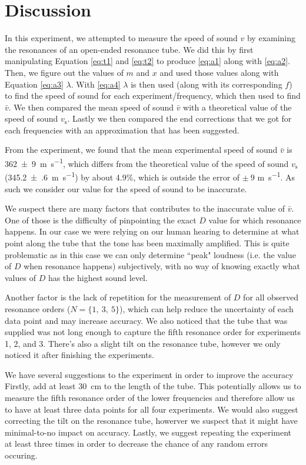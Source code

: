 \documentclass[letter]{article}
\numberwithin{equation}{section}
\numberwithin{figure}{section}
\numberwithin{table}{section}
\begin{document}
\section{Discussion}
In this experiment, we attempted to measure the speed of sound \(v\) by examining the resonances of an open-ended resonance tube. We did this by first manipulating Equation \ref{eq:t1} and \ref{eq:t2} to produce \eqref{eq:a1} along with \eqref{eq:a2}. Then, we figure out the values of \(m\) and \(x\) and used those values along with Equation \ref{eq:a3} \(\lambda\). With \eqref{eq:a4} \(\lambda\) is then used (along with its corresponding \(f\)) to find the speed of sound for each experiment/frequency, which then used to find \(\bar{v}\). We then compared the mean speed of sound \(\bar{v}\) with a theoretical value of the speed of sound \(v_\mathrm{s}\). Lastly we then compared the end corrections that we got for each frequencies with an approximation that has been suggested.

From the experiment, we found that the mean experimental speed of sound \(\bar{v}\) is \SI{362(9)}{\metre\per\second}, which differs from the theoretical value of the speed of sound \(v_{\mathrm{s}}\) (\SI{345.2(6)}{\metre\per\second}) by about 4.9\%, which is outside the error of \(\pm\ 9\) \si{\metre\per\second}. As such we consider our value for the speed of sound to be inaccurate.

We suspect there are many factors that contributes to the inaccurate value of \(\bar{v}\). One of those is the difficulty of pinpointing the exact \(D\) value for which resonance happens. In our case we were relying on our human hearing to determine at what point along the tube that the tone has been maximally amplified. This is quite problematic as in this case we can only determine ``peak" loudness (i.e. the value of \(D\) when resonance happens) subjectively, with no way of knowing exactly what values of \(D\) has the highest sound level.

Another factor is the lack of repetition for the measurement of \(D\) for all observed resonance orders (\(N = \{1, \ 3, \ 5\}\)), which can help reduce the uncertainty of each data point and may increase accuracy. We also noticed that the tube that was supplied was not long enough to capture the fifth resonance order for experiments 1, 2, and 3. There's also a slight tilt on the resonance tube, however we only noticed it after finishing the experiments.

We have several suggestions to the experiment in order to improve the accuracy Firstly, add at least \SI{30}{\cm} to the length of the tube. This potentially allows us to measure the fifth resonance order of the lower frequencies and therefore allow us to have at least three data points for all four experiments. We would also suggest correcting the tilt on the resonance tube, howerver we suspect that it might have minimal-to-no impact on accuracy. Lastly, we suggest repeating the experiment at least three times in order to decrease the chance of any random errors occuring.
\end{document}
